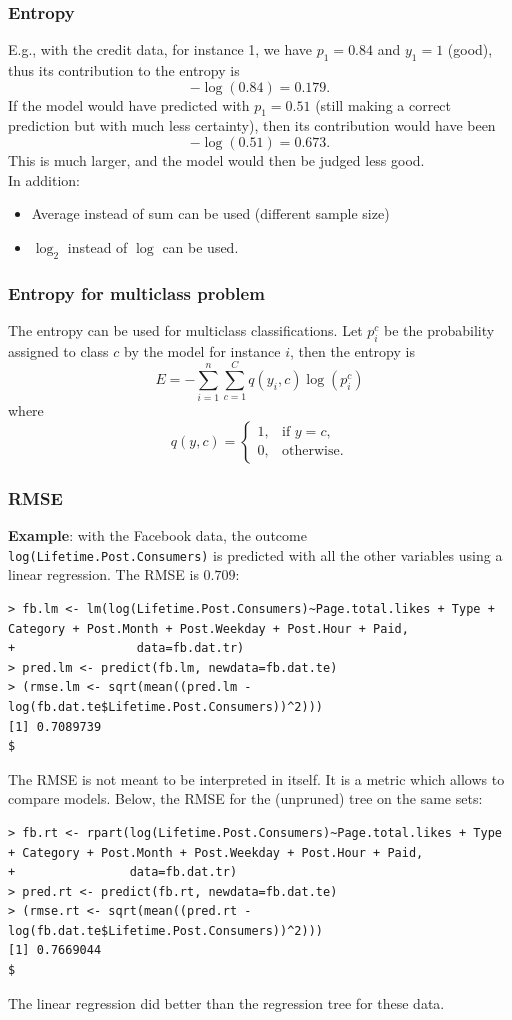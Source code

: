 \begin{frame}
\frametitle{Entropy}
E.g., with the credit data, for instance 1, we have $p_1=0.84$ and $y_1=1$ (good), thus its contribution to the entropy is 
$$
-\log(0.84) = 0.179.
$$ 
If the model would have predicted with $p_1=0.51$ (still making a correct prediction but with much less certainty), then its contribution would have been
$$
-\log(0.51) = 0.673.
$$ 
This is much larger, and the model would then be judged less good.\\
\vspace{0.2cm}
In addition:
\begin{itemize}
\item Average instead of sum can be used (different sample size)
\item $\log_2$ instead of $\log$ can be used.
\end{itemize}
\end{frame}
\begin{frame}
\frametitle{Entropy for multiclass problem}
The entropy can be used for multiclass classifications. Let $p_i^c$ be the probability assigned to class $c$ by the model for instance $i$, then the entropy is
$$
E=-\sum_{i=1}^n \sum_{c=1}^C q(y_i,c) \log(p_i^c)
$$
where
$$
q(y, c) = \left\{
\begin{array}{ll}
1, & \mbox{if } y=c,\\
0, & \mbox{otherwise}.
\end{array}
\right.
$$
\end{frame}
\begin{frame}[fragile]
\frametitle{RMSE}
{\bf Example}: with the Facebook data, the outcome {\tt log(Lifetime.Post.Consumers)} is predicted with all the other variables using a linear regression. The RMSE is $0.709$:\\
\tiny
\begin{verbatim}
> fb.lm <- lm(log(Lifetime.Post.Consumers)~Page.total.likes + Type + Category + Post.Month + Post.Weekday + Post.Hour + Paid, 
+                 data=fb.dat.tr)
> pred.lm <- predict(fb.lm, newdata=fb.dat.te)
> (rmse.lm <- sqrt(mean((pred.lm - log(fb.dat.te$Lifetime.Post.Consumers))^2)))
[1] 0.7089739                                                                     $
\end{verbatim}
\normalsize
The RMSE is not meant to be interpreted in itself. It is a metric which allows to compare models. Below, the RMSE for the (unpruned) tree on the same sets:\\
\tiny
\begin{verbatim}
> fb.rt <- rpart(log(Lifetime.Post.Consumers)~Page.total.likes + Type + Category + Post.Month + Post.Weekday + Post.Hour + Paid, 
+                data=fb.dat.tr)
> pred.rt <- predict(fb.rt, newdata=fb.dat.te)
> (rmse.rt <- sqrt(mean((pred.rt - log(fb.dat.te$Lifetime.Post.Consumers))^2)))
[1] 0.7669044                                                                                                            $
\end{verbatim}
\normalsize
The linear regression did better than the regression tree for these data.
\end{frame}
